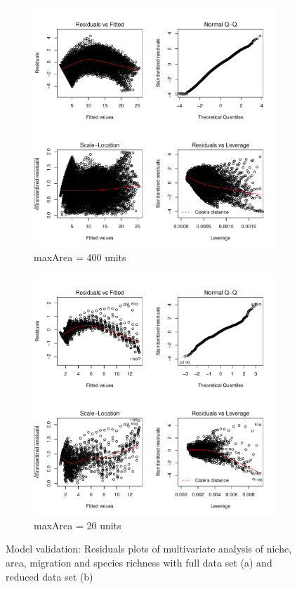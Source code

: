 \documentclass{article}
\begin{document}
\begin{figure}[h!]
  \centering
  \begin{subfigure}[b]{0.4\linewidth}
    \includegraphics[width=\linewidth]{../../Results/Simulation/NicheAreaMigrationLmPlot_1.pdf}
    \caption{maxArea = 400 units}
  \end{subfigure}
  \begin{subfigure}[b]{0.4\linewidth}
    \includegraphics[width=\linewidth]{../../Results/Simulation/NicheAreaMigrationLmPlot_20.pdf}
    \caption{maxArea = 20 units}
  \end{subfigure}
  \caption{Model validation: Residuals plots of multivariate analysis of niche, area, migration and species richness with full data set (a) and reduced data set (b)}
  \label{fig:Model validation multivariate 1}
\end{figure}
\end{document}
